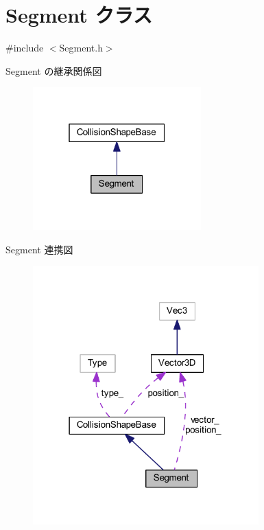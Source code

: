 \hypertarget{class_segment}{}\section{Segment クラス}
\label{class_segment}


{\ttfamily \#include $<$Segment.\+h$>$}



Segment の継承関係図\nopagebreak
\begin{figure}[H]
\begin{center}
\leavevmode
\includegraphics[width=184pt]{class_segment__inherit__graph}
\end{center}
\end{figure}


Segment 連携図\nopagebreak
\begin{figure}[H]
\begin{center}
\leavevmode
\includegraphics[width=247pt]{class_segment__coll__graph}
\end{center}
\end{figure}
